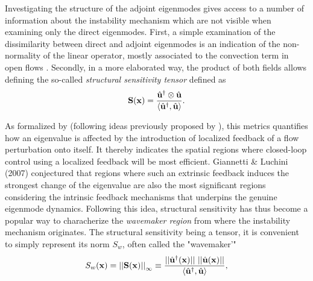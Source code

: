 \documentclass[twocolumn,10pt]{asme2ej}
\newcommand{\be}[1]{ \begin{equation} \label{#1}}
\newcommand{\ee}{\end{equation}}
\begin{document}
Investigating the structure of the adjoint eigenmodes gives access to a number of information about the instability mechanism which are not visible when examining only the direct eigenmodes. First, a simple examination of the dissimilarity between direct and adjoint eigenmodes is an indication of the non-normality of the linear operator, mostly associated to the convection term in open flows \cite{Jmc2005}. Secondly, in a more elaborated way, the product of both fields allows defining the so-called {\em structural sensitivity tensor } defined as 
\be{StructurrTens} 
{\bf{S}}({\bf{x}}) = \frac{ \hat{\bf u}^\dag \otimes \hat{\bf u} }{{\left<\hat{\bf u}^\dag, \hat{\bf u}\right>}}.
\ee 

As formalized by \cite{GiannettiLuchini} (following ideas previously proposed by \cite{hill1992theoretical}), this metrics quantifies how an eigenvalue is affected by the introduction of localized feedback of a flow perturbation onto itself. It thereby indicates the spatial regions where closed-loop control using a localized feedback will be most efficient. Giannetti \& Luchini (2007) conjectured that regions where such an extrinsic feedback induces the strongest change of the eigenvalue are also the most significant regions considering the intrinsic feedback mechanisms that underpins the genuine eigenmode dynamics. Following this idea, structural sensitivity has thus become a popular way to characherize the  {\em wavemaker region} from where the instability mechanism originates. The structural sensitivity being a tensor, it is convenient to simply represent its norm $S_w$, often called the "wavemaker'" 
\be{Structursens} 
S_w({\bf x}) =  {||{\bf{S}}({\bf{x}})||}_\infty \equiv \frac{ ||\hat{\bf u}^\dag({\bf x})|| \,\, ||\hat{\bf u}({\bf x})|| }{{\left<\hat{\bf u}^\dag, \hat{\bf u}\right>}},
\ee 
\end{document}
